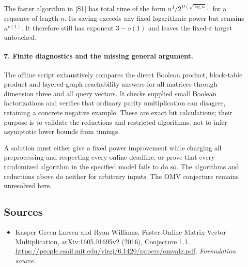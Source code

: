 \documentclass[11pt]{article}
\begin{document}
The faster algorithm in [S1] has total time of the form $n^3/2^{\Omega(\sqrt{\log n})}$ for a sequence of length $n$. Its saving exceeds any fixed logarithmic power but remains $n^{o(1)}$. It therefore still has exponent $3-o(1)$ and leaves the fixed-$\varepsilon$ target untouched.

\paragraph{7. Finite diagnostics and the missing general argument.}
The offline script exhaustively compares the direct Boolean product, block-table product and layered-graph reachability answers for all matrices through dimension three and all query vectors. It checks supplied small Boolean factorizations and verifies that ordinary parity multiplication can disagree, retaining a concrete negative example. These are exact bit calculations; their purpose is to validate the reductions and restricted algorithms, not to infer asymptotic lower bounds from timings.

A solution must either give a fixed power improvement while charging all preprocessing and respecting every online deadline, or prove that every randomized algorithm in the specified model fails to do so. The algorithms and reductions above do neither for arbitrary inputs. The OMV conjecture remains unresolved here.

\subsection{Sources}
\begin{itemize}
\item[S1]Kasper Green Larsen and Ryan Williams, Faster Online Matrix-Vector Multiplication, arXiv:1605.01695v2 (2016), Conjecture 1.1.
\url{https://people.csail.mit.edu/virgi/6.1420/papers/omvalg.pdf}.
\textit{Formulation source.}
\end{itemize}
\end{document}
